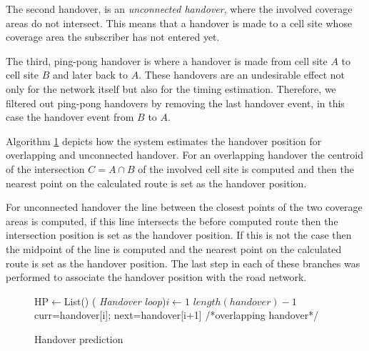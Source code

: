 \documentclass[twocolumn]{bmcart}%
\makeatletter
\newcommand{\removelatexerror}{\let\@latex@error\@gobble}
\makeatother
\begin{document}
The second handover, is an \emph{unconnected handover}, where the involved coverage areas do not intersect. This means that a handover is made to a cell site whose coverage area the subscriber has not entered yet.

The third, ping-pong handover is where a handover is made from cell site $A$ to cell site $B$ and later back to $A$. These handovers are an undesirable effect not only for the network itself but also for the timing estimation. Therefore, we filtered out ping-pong handovers by removing the last handover event, in this case the handover event from $B$ to $A$.

Algorithm \ref{alg:prediction} depicts how the system estimates the handover position for overlapping and unconnected handover. For an overlapping handover the centroid of the intersection $C=A \cap B$ of the involved cell site is computed and then the nearest point on the calculated route is set as the handover position. 

For unconnected handover the line between the closest points of the two coverage areas is computed, if this line intersects the before computed route then the intersection position is set as the handover position. If this is not the case then the midpoint of the line is computed and the nearest point on the calculated route is set as the handover position. The last step in each of these branches was performed to associate the handover position with the road network.
\SetAlFnt{\footnotesize}

\begin{figure}[!t]
 \removelatexerror
  \begin{algorithm}[H]
   \caption{Handover prediction}
   \label{alg:prediction}
   HP$\leftarrow$List()\;
   \For( \emph{Handover loop}){$i\leftarrow 1$ \KwTo $length(handover)-1$}
   {
      curr=handover[i]; next=handover[i+1]\;
      /*overlapping handover*/\\
      }
  \end{algorithm}
\end{figure}
\end{document}
